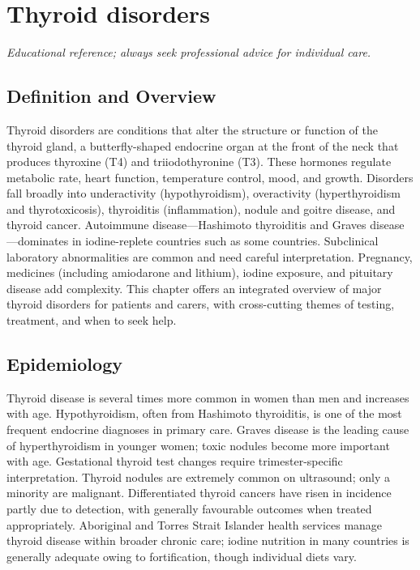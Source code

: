 \chapter{Thyroid disorders}

\medskip
\noindent\textit{Educational reference; always seek professional advice for individual care.}

\section*{Definition and Overview}
Thyroid disorders are conditions that alter the structure or function of the thyroid gland, a butterfly-shaped endocrine organ at the front of the neck that produces thyroxine (T4) and triiodothyronine (T3). These hormones regulate metabolic rate, heart function, temperature control, mood, and growth. Disorders fall broadly into underactivity (hypothyroidism), overactivity (hyperthyroidism and thyrotoxicosis), thyroiditis (inflammation), nodule and goitre disease, and thyroid cancer. Autoimmune disease---Hashimoto thyroiditis and Graves disease---dominates in iodine-replete countries such as some countries. Subclinical laboratory abnormalities are common and need careful interpretation. Pregnancy, medicines (including amiodarone and lithium), iodine exposure, and pituitary disease add complexity. This chapter offers an integrated overview of major thyroid disorders for patients and carers, with cross-cutting themes of testing, treatment, and when to seek help.

\section*{Epidemiology}
Thyroid disease is several times more common in women than men and increases with age. Hypothyroidism, often from Hashimoto thyroiditis, is one of the most frequent endocrine diagnoses in primary care. Graves disease is the leading cause of hyperthyroidism in younger women; toxic nodules become more important with age. Gestational thyroid test changes require trimester-specific interpretation. Thyroid nodules are extremely common on ultrasound; only a minority are malignant. Differentiated thyroid cancers have risen in incidence partly due to detection, with generally favourable outcomes when treated appropriately. Aboriginal and Torres Strait Islander health services manage thyroid disease within broader chronic care; iodine nutrition in many countries is generally adequate owing to fortification, though individual diets vary.


